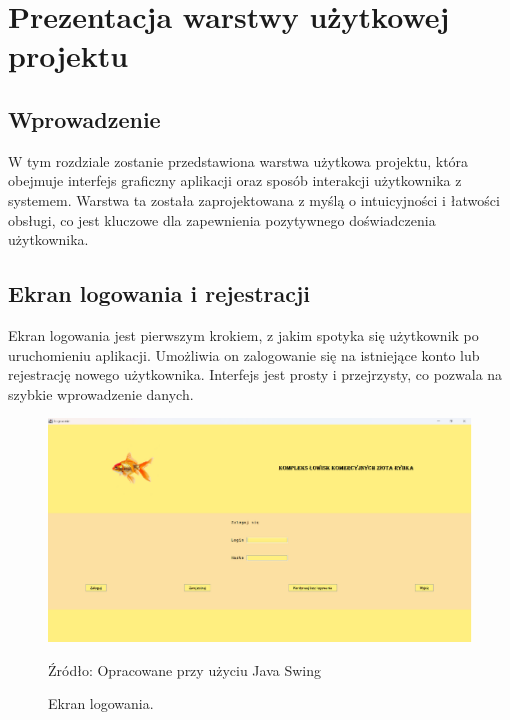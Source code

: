 \chapter{Prezentacja warstwy użytkowej projektu}
\label{chap:prezentacja}
\section{Wprowadzenie}
W tym rozdziale zostanie przedstawiona warstwa użytkowa projektu, która obejmuje interfejs graficzny aplikacji oraz sposób interakcji użytkownika z systemem. Warstwa ta została zaprojektowana z myślą o intuicyjności i łatwości obsługi, co jest kluczowe dla zapewnienia pozytywnego doświadczenia użytkownika.

\section{Ekran logowania i rejestracji}
Ekran logowania jest pierwszym krokiem, z jakim spotyka się użytkownik po uruchomieniu aplikacji. Umożliwia on zalogowanie się na istniejące konto lub rejestrację nowego użytkownika. Interfejs jest prosty i przejrzysty, co pozwala na szybkie wprowadzenie danych.
\begin{figure}[H]
    \centering
    \includegraphics[width=0.8\linewidth]{figures/login.eps}
    \caption{Ekran logowania.}
    \label{fig:login_screen}
    \small{Źródło: Opracowane przy użyciu Java Swing}
\end{figure}
\clearpage

